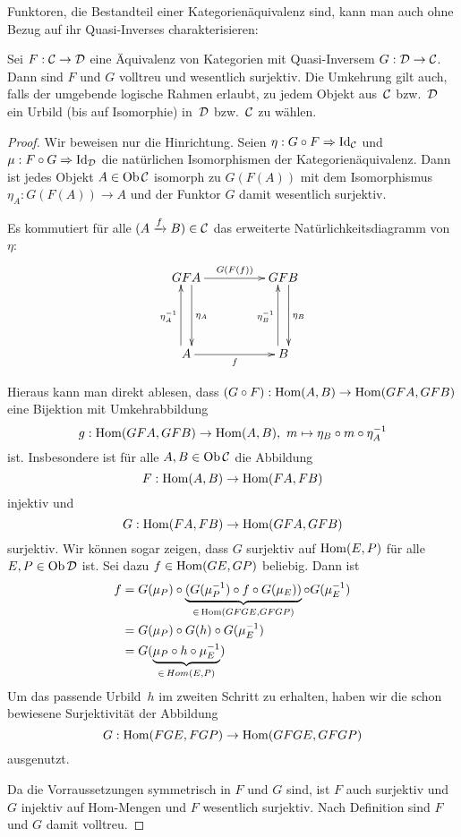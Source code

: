 Funktoren, die Bestandteil einer Kategorienäquivalenz sind, kann man auch ohne
Bezug auf ihr Quasi-Inverses charakterisieren:
\begin{lemma}\label{equivVolltreuWesSurj} Sei $F : \mathcal{C} \to \mathcal{D}$ eine Äquivalenz von
Kategorien mit Quasi-Inversem $G : \mathcal{D} \to \mathcal{C}$. Dann sind $F$ und $G$ volltreu und
wesentlich surjektiv. Die Umkehrung gilt auch, falls der umgebende logische
Rahmen erlaubt, zu jedem Objekt aus~$\mathcal{C}$ bzw.~$\mathcal{D}$ ein Urbild (bis auf
Isomorphie) in~$\mathcal{D}$ bzw.~$\mathcal{C}$ zu wählen.
\end{lemma}
\begin{proof}Wir beweisen nur die Hinrichtung.
Seien $\eta:G \circ F \Rightarrow \mathrm{Id}_{\mathcal{C}}$ und $\mu:F \circ G \Rightarrow
\mathrm{Id}_{\mathcal{D}}$ die natürlichen Isomorphismen der Kategorienäquivalenz. Dann ist
jedes Objekt $A \in \operatorname{Ob} \mathcal{C}$ isomorph zu $G(F(A))$ mit dem Isomorphismus
$\eta_{A}:G(F(A)) \to A$ und der Funktor $G$ damit wesentlich surjektiv.

Es kommutiert für alle $(A \xrightarrow{f} B) \in \mathcal{C}$ das erweiterte Natürlichkeitsdiagramm von~$\eta$:
\[ \xymatrixcolsep{4pc}\xymatrixrowsep{4pc}\xymatrix{
GFA \ar@<1ex>[d]^{\eta_{A}} \ar[r]^{G(F(f))} & GFB \ar@<1ex>[d]^{\eta_{B}} \\
A \ar@<1ex>[u]^{\eta_{A}^{-1}} \ar[r]_{f} & B \ar@<1ex>[u]^{\eta_{B}^{-1}}
} \]

Hieraus kann man direkt ablesen, dass $(G \circ F):\mathrm{Hom}(A, B) \to \mathrm{Hom}(GFA, GFB)$ eine Bijektion mit Umkehrabbildung
  \[ g : \mathrm{Hom}(GFA, GFB) \to \mathrm{Hom}(A, B),\ m \mapsto \eta_{B} \circ m \circ \eta_{A}^{-1} \]
ist. Insbesondere ist für alle $A, B \in \operatorname{Ob} \mathcal{C}$ die Abbildung
\[ F:\mathrm{Hom}(A, B) \to \mathrm{Hom}(FA, FB) \]
injektiv und
\[ G : \mathrm{Hom}(FA, FB) \to \mathrm{Hom}(GFA, GFB) \]
surjektiv. Wir können sogar zeigen, dass $G$ surjektiv auf $\mathrm{Hom}(E, P)$ für alle $E, P \in \operatorname{Ob} \mathcal{D}$ ist. Sei dazu $f \in \mathrm{Hom}(GE, GP)$ beliebig. Dann ist
\begin{align*}
f &= G(\mu_{P}) \circ \underbrace{(G(\mu_{P}^{-1}) \circ f \circ G(\mu_{E}))}_{\in\,\mathrm{Hom}(GFGE, GFGP)} \circ G(\mu_{E}^{-1})\\
&= G(\mu_{P}) \circ G(h) \circ G(\mu_{E}^{-1})\\
&= G(\underbrace{\mu_{P} \circ h \circ \mu_{E}^{-1}}_{\in\,Hom(E, P)})
\end{align*}
Um das passende Urbild~$h$ im zweiten Schritt zu erhalten, haben wir die schon
bewiesene Surjektivität der Abbildung
  \[ G:\mathrm{Hom}(FGE, FGP) \to \mathrm{Hom}(GFGE, GFGP) \]
ausgenutzt.

Da die Vorraussetzungen symmetrisch in $F$ und $G$ sind, ist $F$ auch surjektiv und $G$ injektiv auf Hom-Mengen und $F$ wesentlich surjektiv. Nach Definition sind $F$ und $G$ damit volltreu.
\end{proof}


